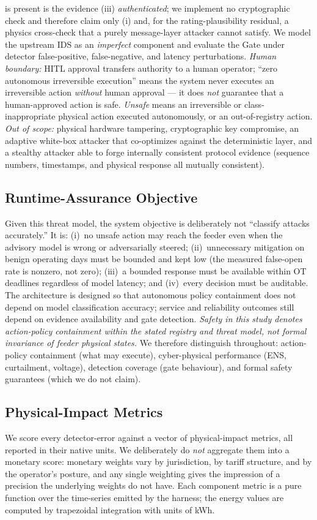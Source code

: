 is present is the evidence (iii) \emph{authenticated}; we implement no
cryptographic check and therefore claim only (i) and, for the
rating-plausibility residual, a physics cross-check that a purely
message-layer attacker cannot satisfy. We model the upstream IDS as an
\emph{imperfect} component and evaluate the Gate under detector
false-positive, false-negative, and latency perturbations. \emph{Human boundary:} HITL approval transfers authority to
a human operator; ``zero autonomous irreversible execution'' means the
system never executes an irreversible action \emph{without} human
approval --- it does \emph{not} guarantee that a human-approved action is
safe. \emph{Unsafe} means an irreversible or class-inappropriate physical
action executed autonomously, or an out-of-registry action.
\emph{Out of scope:} physical hardware tampering, cryptographic key
compromise, an adaptive white-box attacker that co-optimizes against the
deterministic layer, and a stealthy attacker able to forge internally
consistent protocol evidence (sequence numbers, timestamps, and physical
response all mutually consistent).

\subsection{Runtime-Assurance Objective}
\label{sec:bg-objective}
Given this threat model, the system objective is deliberately not
``classify attacks accurately.'' It is: (i)~no unsafe action may reach
the feeder even when the advisory model is wrong or adversarially
steered; (ii)~unnecessary mitigation on benign operating days must be bounded and
kept low (the measured false-open rate is nonzero, not zero); (iii)~a
bounded response must be available within OT deadlines regardless of
model latency; and (iv)~every decision must be auditable. The architecture is
designed so that autonomous policy containment does not depend on model
classification accuracy; service and reliability outcomes still depend on
evidence availability and gate detection. \emph{Safety in this study denotes
action-policy containment within the stated registry and threat model, not formal
invariance of feeder physical states.} We therefore distinguish throughout:
action-policy containment (what may execute), cyber-physical performance (ENS,
curtailment, voltage), detection coverage (gate behaviour), and formal safety
guarantees (which we do not claim).

\subsection{Physical-Impact Metrics}
\label{sec:bg-metrics}
We score every detector-error against a vector of physical-impact
metrics, all reported in their native units. We deliberately do
\emph{not} aggregate them into a monetary score: monetary weights vary
by jurisdiction, by tariff structure, and by the operator's posture,
and any single weighting gives the impression of a precision the
underlying weights do not have. Each component metric is a pure
function over the time-series emitted by the harness; the energy
values are computed by trapezoidal integration with units of kWh.

